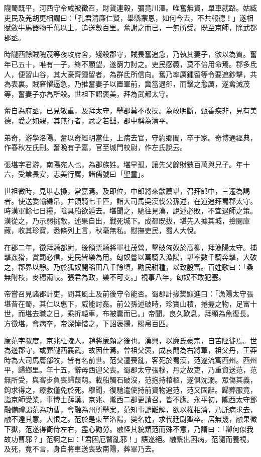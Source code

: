 \begin{pinyinscope}
隴蜀既平，河西守令咸被徵召，財貨連轂，彌竟川澤。唯奮無資，單車就路。姑臧吏民及羌胡更相謂曰：「孔君清廉仁賢，舉縣蒙恩，如何今去，不共報德！」遂相賦斂牛馬器物千萬以上，追送數百里。奮謝之而已，一無所受。既至京師，除武都郡丞。

時隴西餘賊隗茂等夜攻府舍，殘殺郡守，賊畏奮追急，乃執其妻子，欲以為質。奮年已五十，唯有一子，終不顧望，遂窮力討之。吏民感義，莫不倍用命焉。郡多氐人，便習山谷，其大豪齊鍾留者，為群氐所信向。奮乃率厲鍾留等令要遮鈔擊，共為表裏。賊窘懼逼急，乃推奮妻子以置軍前，冀當退卻，而擊之愈厲，遂禽滅茂等，奮妻子亦為所殺。世祖下詔褒美，拜為武都太守。

奮自為府丞，已見敬重，及拜太守，舉郡莫不改操。為政明斷，甄善疾非，見有美德，愛之如親，其無行者，忿之若讎，郡中稱為清平。

弟奇，游學洛陽。奮以奇經明當仕，上病去官，守約鄉閭，卒于家。奇博通經典，作春秋左氏刪。奮晚有子嘉，官至城門校尉，作左氏說云。

張堪字君游，南陽宛人也，為郡族姓。堪早孤，讓先父餘財數百萬與兄子。年十六，受業長安，志美行厲，諸儒號曰「聖童」。

世祖微時，見堪志操，常嘉焉。及即位，中郎將來歙薦堪，召拜郎中，三遷為謁者。使送委輸縑帛，并領騎七千匹，詣大司馬吳漢伐公孫述，在道追拜蜀郡太守。時漢軍餘七日糧，陰具船欲遁去。堪聞之，馳往見漢，說述必敗，不宜退師之策。漢從之，乃示弱挑敵，述果自出，戰死城下。成都既拔，堪先入據其城，撿閱庫藏，收其珍寶，悉條列上言，秋毫無私。慰撫吏民，蜀人大悅。

在郡二年，徵拜騎都尉，後領票騎將軍杜茂營，擊破匈奴於高柳，拜漁陽太守。捕擊姦猾，賞罰必信，吏民皆樂為用。匈奴嘗以萬騎入漁陽，堪率數千騎奔擊，大破之，郡界以靜。乃於狐奴開稻田八千餘頃，勸民耕種，以致殷富。百姓歌曰：「桑無附枝，麥穗兩岐。張君為政，樂不可支。」視事八年，匈奴不敢犯塞。

帝嘗召見諸郡計吏，問其風土及前後守令能否。蜀郡計掾樊顯進曰：「漁陽太守張堪昔在蜀，其仁以惠下，威能討姦。前公孫述破時，珍寶山積，捲握之物，足富十世，而堪去職之日，乘折轅車，布被囊而已。」帝聞，良久歎息，拜顯為魚復長。方徵堪，會病卒，帝深悼惜之，下詔褒揚，賜帛百匹。

廉范字叔度，京兆杜陵人，趙將廉頗之後也。漢興，以廉氏豪宗，自苦陘徙焉。世為邊郡守，或葬隴西襄武，故因仕焉。曾祖父褒，成哀閒為右將軍，祖父丹，王莽時為大司馬庸部牧，皆有名前世。范父遭喪亂，客死於蜀漢，范遂流寓西州。西州平，歸鄉里。年十五，辭母西迎父喪。蜀郡太守張穆，丹之故吏，乃重資送范，范無所受，與客步負喪歸葭萌。載船觸石破沒，范抱持棺柩，遂俱沈溺。眾傷其義，鉤求得之，療救僅免於死。穆聞，復馳遣使持前資物追范，范又固辭。歸葬服竟，詣京師受業，事博士薛漢。京兆、隴西二郡更請召，皆不應。永平初，隴西太守鄧融備禮謁范為功曹，會融為州所舉案，范知事譴難解，欲以權相濟，乃託病求去，融不達其意，大恨之。范於是東至洛陽，變名姓，求代廷尉獄卒。居無幾，融果徵下獄，范遂得衛侍左右，盡心勸勞。融怪其貌類范而殊不意，乃謂曰：「卿何似我故功曹邪？」范訶之曰：「君困厄瞀亂邪！」語遂絕。融繫出困病，范隨而養視，及死，竟不言，身自將車送喪致南陽，葬畢乃去。


\end{pinyinscope}
